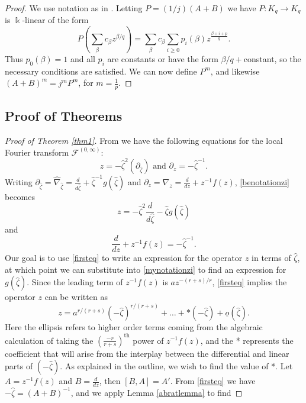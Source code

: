 \documentclass[11pt]{amsart}
\theoremstyle{theorem}
\theoremstyle{lemma}
\theoremstyle{corollary}
\theoremstyle{proposition}
\theoremstyle{definition}
\theoremstyle{remark}
\def\z{\hat{\zeta}}
\begin{document}
\begin{proof}
    We use notation as in \cite{dima}.  Letting $P=(1/j)(A+B)$ we have $P:K_q\to K_q$ is $\Bbbk$-linear of the form
    $$P\left(\sum_{\beta}c_{\beta}z^{\beta/q} \right)=\sum_{\beta}c_{\beta}\sum_{i\geq 0}p_i(\beta)z^{\frac{\beta+i+p}{q}}.$$
    Thus $p_0(\beta)=1$ and all $p_i$ are constants or have the form $\beta/q+$constant, so the necessary conditions \cite[Section 7.1, conditions (1) and (2)]{dima} are satisfied.  We can now define $P^m$, and likewise $(A+B)^m=j^mP^m$, for $m=\frac{1}{p}$.
\end{proof}


\subsection{Proof of Theorems}
\begin{proof}[Proof of Theorem \ref{thm1}] From \cite[Proposition 3.7]{bloch} we have the following equations for the local Fourier transform $\mathcal{F}^{(0,\infty)}$:
\begin{equation}\label{benotationzi}
    z=-\z^2(\partial_{\z}) \text{ and } \partial_z=-\z^{-1}.
\end{equation}
Writing $\partial_{\z}=\hat{\nabla}_{\z}=\frac{d}{d\z}+\z^{-1}g(\z)$ and $\partial_z=\nabla_{z}=\frac{d}{dz}+z^{-1}f(z)$, \eqref{benotationzi} becomes
\begin{equation}\label{mynotationzi}
    z=-\z^2\frac{d}{d\z}-\z g(\z)
\end{equation}
 and
\begin{equation}\label{firsteq}
    \frac{d}{dz}+z^{-1}f(z)=-\z^{-1}.
\end{equation}
Our goal is to use \eqref{firsteq} to write an expression for the operator $z$ in terms of $\z$, at which point we can substitute into \eqref{mynotationzi} to find an expression for $g(\z)$.  Since the leading term of $z^{-1}f(z)$ is $az^{-(r+s)/r}$, \eqref{firsteq} implies the operator $z$ can be written as
\begin{equation}\label{zdefzi}
    z=a^{r/(r+s)}(-\z)^{r/(r+s)}+\dots+*(-\z)+\underline{o}(\z).
\end{equation}
Here the ellipsis refers to higher order terms coming from the algebraic calculation of taking the $(\frac{-r}{r+s})^{\text{th}}$ power of $z^{-1}f(z)$, and the * represents the coefficient that will arise from the interplay between the differential and linear parts of $(-\z)$.  As explained in the outline, we wish to find the value of *.  Let $A=z^{-1}f(z)$ and $B=\frac{d}{dz}$, then $[B,A]=A'$. From \eqref{firsteq} we have $-\z=(A+B)^{-1}$, and we apply Lemma \ref{abratlemma} to find

\end{proof}
\end{document}
